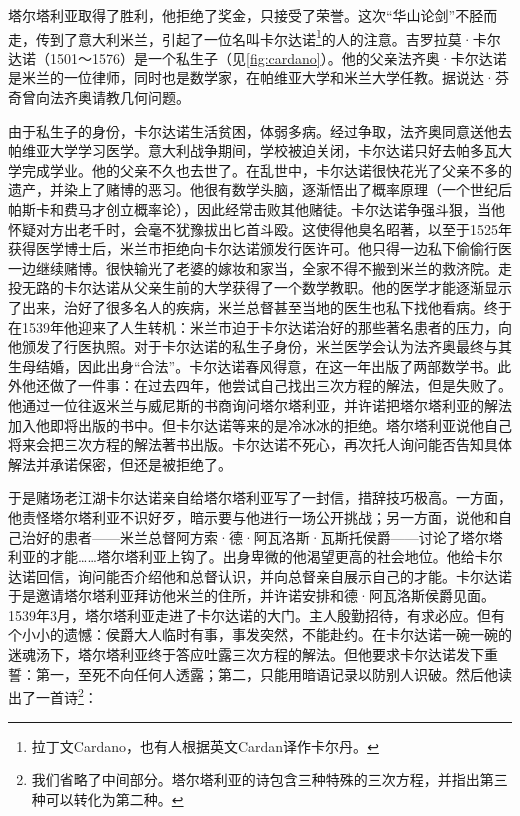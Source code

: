 \documentclass[b5paper]{ctexart}
\begin{document}
塔尔塔利亚取得了胜利，他拒绝了奖金，只接受了荣誉。这次“华山论剑”不胫而走，传到了意大利米兰，引起了一位名叫卡尔达诺\footnote{拉丁文Cardano，也有人根据英文Cardan译作卡尔丹。}的人的注意。吉罗拉莫·卡尔达诺（1501～1576）是一个私生子（见\cref{fig:cardano}）。他的父亲法齐奥·卡尔达诺是米兰的一位律师，同时也是数学家，在帕维亚大学和米兰大学任教。据说达·芬奇曾向法齐奥请教几何问题。

由于私生子的身份，卡尔达诺生活贫困，体弱多病。经过争取，法齐奥同意送他去帕维亚大学学习医学。意大利战争期间，学校被迫关闭，卡尔达诺只好去帕多瓦大学完成学业。他的父亲不久也去世了。在乱世中，卡尔达诺很快花光了父亲不多的遗产，并染上了赌博的恶习。他很有数学头脑，逐渐悟出了概率原理（一个世纪后帕斯卡和费马才创立概率论），因此经常击败其他赌徒。卡尔达诺争强斗狠，当他怀疑对方出老千时，会毫不犹豫拔出匕首斗殴。这使得他臭名昭著，以至于1525年获得医学博士后，米兰市拒绝向卡尔达诺颁发行医许可。他只得一边私下偷偷行医一边继续赌博。很快输光了老婆的嫁妆和家当，全家不得不搬到米兰的救济院。走投无路的卡尔达诺从父亲生前的大学获得了一个数学教职。他的医学才能逐渐显示了出来，治好了很多名人的疾病，米兰总督甚至当地的医生也私下找他看病。终于在1539年他迎来了人生转机：米兰市迫于卡尔达诺治好的那些著名患者的压力，向他颁发了行医执照。对于卡尔达诺的私生子身份，米兰医学会认为法齐奥最终与其生母结婚，因此出身“合法”。卡尔达诺春风得意，在这一年出版了两部数学书。此外他还做了一件事：在过去四年，他尝试自己找出三次方程的解法，但是失败了。他通过一位往返米兰与威尼斯的书商询问塔尔塔利亚，并许诺把塔尔塔利亚的解法加入他即将出版的书中。但卡尔达诺等来的是冷冰冰的拒绝。塔尔塔利亚说他自己将来会把三次方程的解法著书出版。卡尔达诺不死心，再次托人询问能否告知具体解法并承诺保密，但还是被拒绝了。

于是赌场老江湖卡尔达诺亲自给塔尔塔利亚写了一封信，措辞技巧极高。一方面，他责怪塔尔塔利亚不识好歹，暗示要与他进行一场公开挑战；另一方面，说他和自己治好的患者——米兰总督阿方索·德·阿瓦洛斯·瓦斯托侯爵——讨论了塔尔塔利亚的才能……塔尔塔利亚上钩了。出身卑微的他渴望更高的社会地位。他给卡尔达诺回信，询问能否介绍他和总督认识，并向总督亲自展示自己的才能。卡尔达诺于是邀请塔尔塔利亚拜访他米兰的住所，并许诺安排和德·阿瓦洛斯侯爵见面。1539年3月，塔尔塔利亚走进了卡尔达诺的大门。主人殷勤招待，有求必应。但有个小小的遗憾：侯爵大人临时有事，事发突然，不能赴约。在卡尔达诺一碗一碗的迷魂汤下，塔尔塔利亚终于答应吐露三次方程的解法。但他要求卡尔达诺发下重誓：第一，至死不向任何人透露；第二，只能用暗语记录以防别人识破。然后他读出了一首诗\footnote{我们省略了中间部分。塔尔塔利亚的诗包含三种特殊的三次方程，并指出第三种可以转化为第二种。}：
\end{document}
